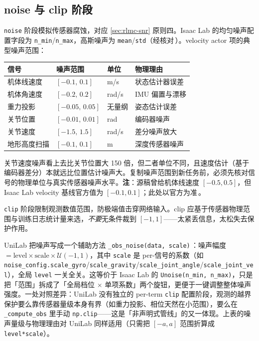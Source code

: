 \subsection{noise 与 clip 阶段}
\label{sec:rlmc-noise-clip}

\verb|noise| 阶段模拟传感器腐蚀，对应 \cref{sec:rlmc-snr} 原则四。Isaac Lab 的均匀噪声配置字段为 \verb|n_min|/\verb|n_max|，高斯噪声为 \verb|mean|/\verb|std|（经核对\,\cite{isaaclab2024}）。velocity actor 项的典型噪声范围：

\begin{center}
\small
\begin{tabular}{@{}llll@{}}
\toprule
信号 & 噪声范围 & 单位 & 物理理由 \\
\midrule
机体线速度 & $[-0.1,\,0.1]$ & m/s & 状态估计器误差\,\cite{isaaclab2024} \\
机体角速度 & $[-0.2,\,0.2]$ & rad/s & IMU 偏置与漂移 \\
重力投影 & $[-0.05,\,0.05]$ & 无量纲 & 姿态估计误差 \\
关节位置 & $[-0.01,\,0.01]$ & rad & 编码器噪声 \\
关节速度 & $[-1.5,\,1.5]$ & rad/s & 差分噪声放大 \\
地形高度扫描 & $[-0.1,\,0.1]$ & m & 深度传感器噪声 \\
\bottomrule
\end{tabular}
\end{center}

\begin{pitfall}[别脱离单位读这些数]
关节速度噪声看上去比关节位置大 150 倍，但二者单位不同，且速度估计（基于编码器差分）本就远比位置估计噪声大。复制噪声范围到新任务前，必须先核对信号的物理单位与真实传感器噪声水平。\textbf{注}：源稿曾给机体线速度 $[-0.5,0.5]$，但 Isaac Lab velocity 基线官方值为 $[-0.1,0.1]$；此处以官方为准\,\cite{isaaclab2024}。
\end{pitfall}

\verb|clip| 阶段限制观测数值范围，防极端值击穿网络输入。clip 应基于传感器物理范围与训练日志统计量来选，\emph{不要}无条件裁到 $[-1,1]$——太紧丢信息，太松失去保护作用。

UniLab 把噪声写成一个辅助方法 \verb|_obs_noise(data, scale)|\,\cite{unilab2026}：噪声幅度 $=\text{level}\times\text{scale}\times\mathcal U(-1,1)$，其中 \verb|scale| 是 per-信号的系数（如 \verb|noise_config.scale_gyro|/\verb|scale_gravity|/\verb|scale_joint_angle|/\verb|scale_joint_vel|），全局 \verb|level| 一关全关。这等价于 Isaac Lab 的 \verb|Unoise(n_min, n_max)|，只是把「范围」拆成了「全局档位 $\times$ 单项系数」两个旋钮，更便于一键调整整体噪声强度。一处对照差异：UniLab 没有独立的 per-term \verb|clip| 配置阶段，观测的越界保护要么靠传感器量级本身有界（如重力投影、相位天然在小范围），要么在 \verb|_compute_obs| 里手动 \verb|np.clip|——这是「非声明式管线」的又一体现。上表的噪声量级与物理理由对 UniLab 同样适用（只需把 $[-a,a]$ 范围折算成 \verb|level*scale|）。

